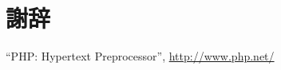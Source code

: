 \documentclass[uplatex,a4paper,12pt]{jsreport}
\begin{document}

\chapter*{謝辞}



\begin{thebibliography}{99}%

   ``PHP: Hypertext Preprocessor'',
  \url{ http://www.php.net/ }

\end{thebibliography}
\appendix
\end{document}
